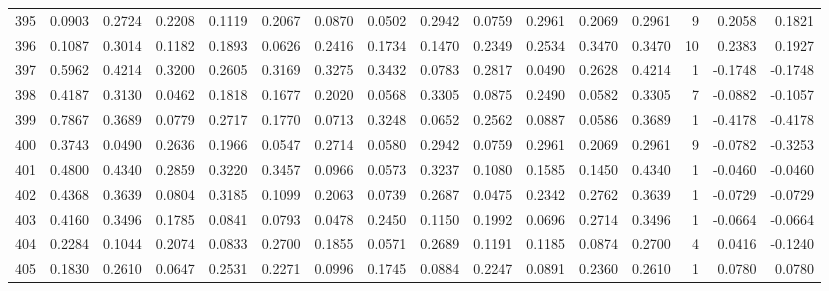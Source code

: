 \begin{tabular}{lrrrrrrrrrrrrrrr}
395 &      0.0903 &  0.2724 &  0.2208 &  0.1119 &  0.2067 &  0.0870 &  0.0502 &  0.2942 &  0.0759 &  0.2961 &   0.2069 &     0.2961 &      9 &                    0.2058 &                     0.1821 \\
396 &      0.1087 &  0.3014 &  0.1182 &  0.1893 &  0.0626 &  0.2416 &  0.1734 &  0.1470 &  0.2349 &  0.2534 &   0.3470 &     0.3470 &     10 &                    0.2383 &                     0.1927 \\
397 &      0.5962 &  0.4214 &  0.3200 &  0.2605 &  0.3169 &  0.3275 &  0.3432 &  0.0783 &  0.2817 &  0.0490 &   0.2628 &     0.4214 &      1 &                   -0.1748 &                    -0.1748 \\
398 &      0.4187 &  0.3130 &  0.0462 &  0.1818 &  0.1677 &  0.2020 &  0.0568 &  0.3305 &  0.0875 &  0.2490 &   0.0582 &     0.3305 &      7 &                   -0.0882 &                    -0.1057 \\
399 &      0.7867 &  0.3689 &  0.0779 &  0.2717 &  0.1770 &  0.0713 &  0.3248 &  0.0652 &  0.2562 &  0.0887 &   0.0586 &     0.3689 &      1 &                   -0.4178 &                    -0.4178 \\
400 &      0.3743 &  0.0490 &  0.2636 &  0.1966 &  0.0547 &  0.2714 &  0.0580 &  0.2942 &  0.0759 &  0.2961 &   0.2069 &     0.2961 &      9 &                   -0.0782 &                    -0.3253 \\
401 &      0.4800 &  0.4340 &  0.2859 &  0.3220 &  0.3457 &  0.0966 &  0.0573 &  0.3237 &  0.1080 &  0.1585 &   0.1450 &     0.4340 &      1 &                   -0.0460 &                    -0.0460 \\
402 &      0.4368 &  0.3639 &  0.0804 &  0.3185 &  0.1099 &  0.2063 &  0.0739 &  0.2687 &  0.0475 &  0.2342 &   0.2762 &     0.3639 &      1 &                   -0.0729 &                    -0.0729 \\
403 &      0.4160 &  0.3496 &  0.1785 &  0.0841 &  0.0793 &  0.0478 &  0.2450 &  0.1150 &  0.1992 &  0.0696 &   0.2714 &     0.3496 &      1 &                   -0.0664 &                    -0.0664 \\
404 &      0.2284 &  0.1044 &  0.2074 &  0.0833 &  0.2700 &  0.1855 &  0.0571 &  0.2689 &  0.1191 &  0.1185 &   0.0874 &     0.2700 &      4 &                    0.0416 &                    -0.1240 \\
405 &      0.1830 &  0.2610 &  0.0647 &  0.2531 &  0.2271 &  0.0996 &  0.1745 &  0.0884 &  0.2247 &  0.0891 &   0.2360 &     0.2610 &      1 &                    0.0780 &                     0.0780 \\

\end{tabular}
